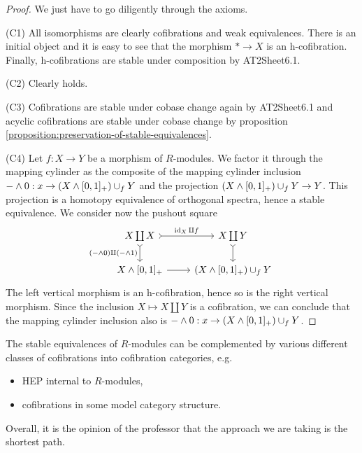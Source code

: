 \begin{proof}
We just have to go diligently through the axioms.

(C1) All isomorphisms are clearly cofibrations and weak equivalences. There is an initial object and it is easy to see that the morphism $*\to X$ is an h-cofibration. Finally, h-cofibrations are stable under composition by AT2Sheet6.1.

(C2) Clearly holds.

(C3) Cofibrations are stable under cobase change again by AT2Sheet6.1 and acyclic cofibrations are stable under cobase change by proposition \ref{proposition:preservation-of-stable-equivalences}.

(C4) Let $f:X\to Y$ be a morphism of $R$-modules. We factor it through the mapping cylinder as the composite of the mapping cylinder inclusion $-\wedge0:x\to (X\wedge[0,1]_+)\cup_f Y$ and the projection $(X\wedge[0,1]_+)\cup_f Y\to Y$. This projection is a homotopy equivalence of orthogonal spectra, hence a stable equivalence. We consider now the pushout square
\[
\begin{tikzcd}
X\coprod X \ar[d,tail,"(-\smsh0)\amalg(-\smsh1)"'] \ar[r,tail,"\id_X\amalg f"] & X\coprod Y \ar[d,tail]\\
X\smsh[0,1]_+ \ar[r,""] & (X\smsh[0,1]_+)\cup_f Y
\end{tikzcd}
\]
The left vertical morphism is an h-cofibration, hence so is the right vertical morphism. Since the inclusion $X\mapsto X\coprod Y$ is a cofibration, we can conclude that the mapping cylinder inclusion also is $-\wedge0:x\to (X\wedge[0,1]_+)\cup_f Y$.
\end{proof}

\begin{remark}
The stable equivalences of $R$-modules can be complemented by various different classes of cofibrations into cofibration categories, e.g.
\begin{itemize}
    \item HEP internal to $R$-modules,
    \item cofibrations in some model category structure.
\end{itemize}
Overall, it is the opinion of the professor that the approach we are taking is the shortest path.
\end{remark}

